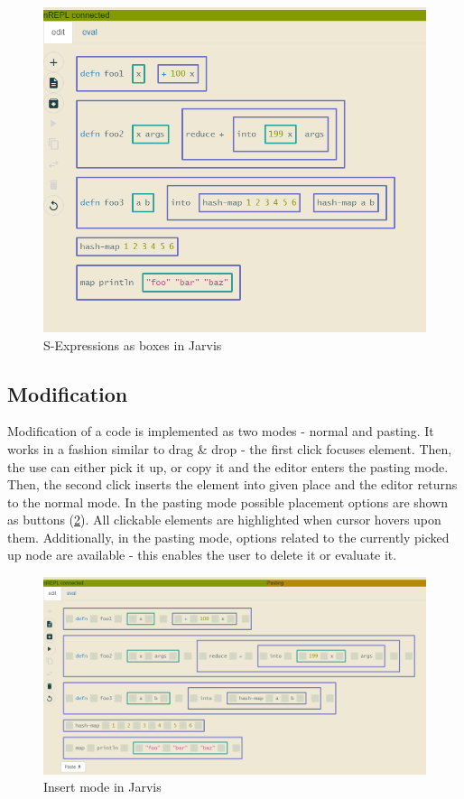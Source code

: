 \documentclass[11pt]{scrartcl}
\begin{document}
\begin{figure}[hbt]
  \includegraphics[scale=0.3]{img/j-boxes_f}
  \caption{S-Expressions as boxes in Jarvis}
  \label{j-box}
\end{figure}



\subsection{Modification}
Modification of a code is implemented as two modes - normal and pasting.
It works in a fashion similar to drag \& drop - the first click focuses element.
Then, the use can either pick it up, or copy it and the editor enters the
pasting mode.
Then, the second click inserts the element into given place and the editor
returns to the normal mode.
In the pasting mode possible placement options are shown as buttons
(\ref{j-insert}).
All clickable elements are highlighted when cursor hovers upon them.
Additionally, in the pasting mode, options related to the currently picked up
node are available - this enables the user to delete it or evaluate it.


\begin{figure}[hbt]
  \includegraphics[scale=0.3]{img/j-insert_f}
  \caption{Insert mode in Jarvis}
  \label{j-insert}
\end{figure}
\end{document}
